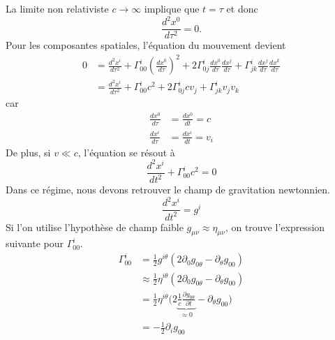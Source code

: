 \documentclass[a4paper,11pt]{report}
\theoremstyle{definition}
\theoremstyle{plain}
\theoremstyle{definition}
\theoremstyle{remark}
\newcommand{\p}{\partial}
\begin{document}
            La limite non relativiste $c\to\infty$ implique que $t = \tau$ et donc
            \begin{equation}
                \frac{d^2x^0}{d\tau^2} = 0.
            \end{equation}
            Pour les composantes spatiales, l'équation du mouvement devient
            \begin{align}
                 0 &=\frac{d^2x^i}{d\tau^2} + \Gamma^i_{00}\left( \frac{dx^0}{d\tau} \right)^2 + 2\Gamma^i_{0j}\frac{dx^0}{d\tau}\frac{dx^j}{d\tau}+\Gamma^i_{jk}\frac{dx^j}{d\tau}\frac{dx^k}{d\tau}\\
                 &= \frac{d^2x^i}{d\tau^2} + \Gamma^i_{00}c^2 + 2\Gamma^i_{0j}cv_j+\Gamma^i_{jk}v_jv_k
            \end{align}
            car
            \begin{align}
                \frac{dx^0}{d\tau} &= \frac{dx^0}{dt} = c \\
                \frac{dx^i}{d\tau} &= \frac{dx^i}{dt} = v_i
            \end{align}
            De plus, si $v\ll c $, l'équation se résout à
            \begin{equation}
                 \frac{d^2x^i}{dt^2} + \Gamma^i_{00}c^2 = 0
            \end{equation}
            Dans ce régime, nous devons retrouver le champ de gravitation newtonnien.
            \begin{equation}
                \frac{d^2x^i}{dt^2} = g^i
            \end{equation}
            Si l'on utilise l'hypothèse de champ faible $g_{\mu\nu}\approx \eta_{\mu\nu}$, on trouve l'expression suivante pour $\Gamma^i_{00}$.
            \begin{align}
                \Gamma^i_{00} &= \frac{1}{2}g^{i\theta}\left( 2\p_0g_{0\theta}-\p_\theta g_{00} \right) \\
                &\approx  \frac{1}{2}\eta^{i\theta}\left( 2\p_0g_{0\theta}-\p_\theta g_{00} \right) \\
                &=  \frac{1}{2}\eta^{i\theta}\bigg( 2\underbrace{\frac{1}{c}\frac{\p g_{0\theta}}{\p t}}_{\approx 0}-\p_\theta g_{00} \bigg) \\
                &= -\frac{1}{2}\p_i g_{00}
            \end{align}
            
\end{document}

